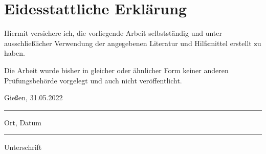 \section*{Eidesstattliche Erklärung}
	\vspace{1cm}
	Hiermit versichere ich, die vorliegende Arbeit selbstständig und unter ausschließlicher Verwendung der angegebenen Literatur und Hilfsmittel erstellt zu haben.
	
	Die Arbeit wurde bisher in gleicher oder ähnlicher Form keiner anderen Prüfungsbehörde vorgelegt und auch nicht veröffentlicht.
	
	\vspace{2cm}
	\parbox{6cm}{\centering Gießen, 31.05.2022\hrule
		\strut \centering\footnotesize Ort, Datum} \hfill\parbox{6cm}{\hrule
		\strut \centering\footnotesize Unterschrift}
